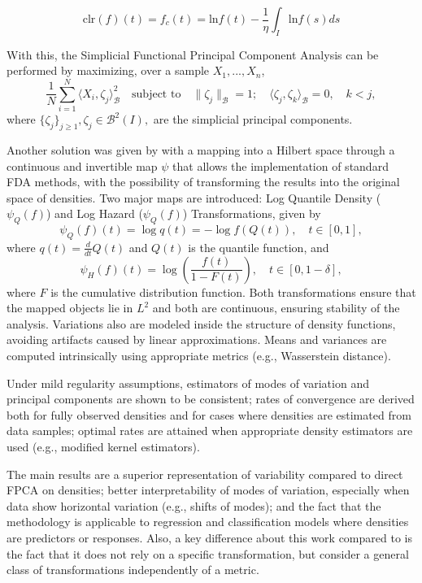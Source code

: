 \documentclass[
	12pt,				%
	oneside,			%
	a4paper,			%
	english,			%
	brazil				%
	]{abntex2ppgsi}
\begin{document}
\[
\text{clr}(f)(t)=f_c(t)=\text{ln}f(t)-\frac{1}{\eta}\int_{I}\text{ln}f(s)ds
\]

With this, the Simplicial Functional Principal Component Analysis can be performed by maximizing, over a sample $X_1, ...,X_n$,
\[
\frac{1}{N} \sum_{i=1}^{N} \langle X_i, \zeta_j \rangle_{\mathcal{B}}^2 
\quad \text{subject to} \quad \|\zeta_j\|_{\mathcal{B}} = 1; \quad \langle \zeta_j, \zeta_k \rangle_{\mathcal{B}} = 0, \quad k < j,
\]
where $\{\zeta_j\}_{j\geq1},\zeta_j \in \mathcal{B}^2(I),$ are the simplicial principal components.

Another solution was given by  with a mapping into a Hilbert space through a continuous and invertible map $\psi$ that allows the implementation of standard FDA methods, with the possibility of transforming the results into the original space of densities. Two major maps are introduced: Log Quantile Density ($\psi_Q(f)$) and Log Hazard ($\psi_Q(f)$) Transformations, given by
\[
\psi_Q(f)(t) = \log q(t) = -\log f(Q(t)), \quad t \in [0,1],
\]
where $q(t) = \frac{d}{dt} Q(t)$ and $Q(t)$ is the quantile function, and
\[
    \psi_H(f)(t) = \log\left( \frac{f(t)}{1 - F(t)} \right), \quad t \in [0,1-\delta],
\]
where $F$ is the cumulative distribution function. Both transformations ensure that the mapped objects lie in $L^2$ and both are continuous, ensuring stability of the analysis. Variations also are modeled inside the structure of density functions, avoiding artifacts caused by linear approximations. Means and variances are computed intrinsically using appropriate metrics (e.g., Wasserstein distance).

Under mild regularity assumptions, estimators of modes of variation and principal components are shown to be consistent; rates of convergence are derived both for fully observed densities and for cases where densities are estimated from data samples; optimal rates are attained when appropriate density estimators are used (e.g., modified kernel estimators).

The main results are a superior representation of variability compared to direct FPCA on densities; better interpretability of modes of variation, especially when data show horizontal variation (e.g., shifts of modes); and the fact that the methodology is applicable to regression and classification models where densities are predictors or responses. Also, a key difference about this work compared to  is the fact that it does not rely on a specific transformation, but consider a general class of transformations independently of a metric. 
\end{document}
